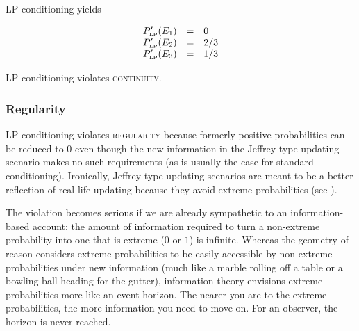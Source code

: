 \documentclass[12pt]{article}
\begin{document}

LP conditioning yields


\begin{equation}
  \label{eq:sherlockcontlp}
  \begin{array}{rcl}
  P'_{\mbox{\tiny LP}}(E_{1})&=&0\\
  P'_{\mbox{\tiny LP}}(E_{2})&=&2/3\\
  P'_{\mbox{\tiny LP}}(E_{3})&=&1/3
\end{array}
\end{equation}

LP conditioning violates \textsc{continuity}.

\subsubsection{Regularity}
\label{Regularity}

LP conditioning violates \textsc{regularity} because formerly positive
probabilities can be reduced to $0$ even though the new information in
the Jeffrey-type updating scenario makes no such requirements (as is
usually the case for standard conditioning). Ironically, Jeffrey-type
updating scenarios are meant to be a better reflection of real-life
updating because they avoid extreme probabilities (see
).

The violation becomes serious if we are already sympathetic to an
infor\-ma\-tion-based account: the amount of information required to turn
a non-extreme probability into one that is extreme ($0$ or $1$) is
infinite. Whereas the geometry of reason considers extreme
probabilities to be easily accessible by non-extreme probabilities
under new information (much like a marble rolling off a table or a
bowling ball heading for the gutter), information theory envisions
extreme probabilities more like an event horizon. The nearer you are
to the extreme probabilities, the more information you need to move
on. For an observer, the horizon is never reached.
\end{document}
